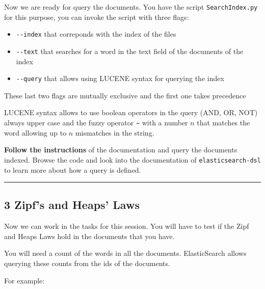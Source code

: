 \documentclass[11pt]{article}
\providecommand{\tightlist}{%
      \setlength{\itemsep}{0pt}\setlength{\parskip}{0pt}}
\begin{document}
Now we are ready for query the documents. You have the script
\texttt{SearchIndex.py} for this purpose, you can invoke the script with
three flags:

\begin{itemize}
\tightlist
\item
  \texttt{-\/-index} that correponds with the index of the files
\item
  \texttt{-\/-text} that searches for a word in the text field of the
  documents of the index
\item
  \texttt{-\/-query} that allows using LUCENE syntax for querying the
  index
\end{itemize}

These last two flags are mutually exclusive and the first one takes
precedence

LUCENE syntax allows to use boolean operators in the query (AND, OR,
NOT) always upper case and the fuzzy operator \texttt{\textasciitilde{}}
with a number \(n\) that matches the word allowing up to \(n\)
mismatches in the string.

\textbf{Follow the instructions} of the documentation and query the
documents indexed. Browse the code and look into the documentation of
\texttt{elasticsearch-dsl} to learn more about how a query is defined.

    \begin{center}\rule{0.5\linewidth}{\linethickness}\end{center}

\subsection{3 Zipf's and Heaps' Laws}\label{zipfs-and-heaps-laws}

Now we can work in the tasks for this session. You will have to test if
the Zipf and Heaps Laws hold in the documents that you have.

You will need a count of the words in all the documents. ElasticSearch
allows querying these counts from the ids of the documents.

For example:
\end{document}
